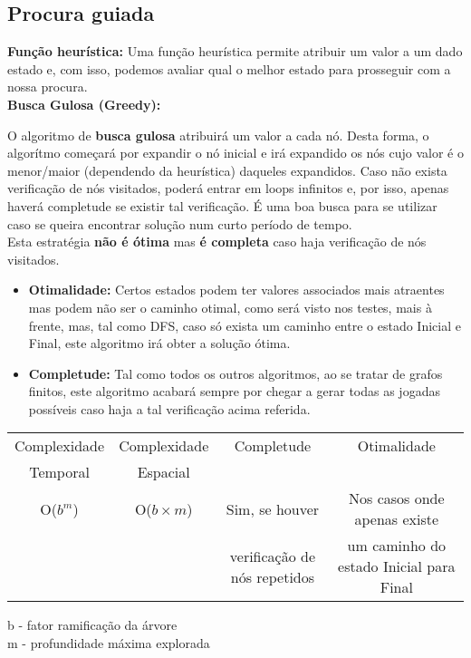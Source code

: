 \documentclass{article}
\begin{document}
\subsection{Procura guiada}
\textbf{Função heurística:} Uma função heurística permite atribuir um valor a um dado estado e, com isso, podemos avaliar qual o melhor estado para prosseguir com a nossa procura.\\[5mm]
\textbf{Busca Gulosa (Greedy):}\par
O algoritmo de \textbf{busca gulosa} atribuirá um valor a cada nó. Desta forma, o algorítmo começará por expandir o nó inicial e irá expandido os nós cujo valor é o menor/maior (dependendo da heurística) daqueles expandidos. Caso não exista verificação de nós visitados, poderá entrar em loops infinitos e, por isso, apenas haverá completude se existir tal verificação. É uma boa busca para se utilizar caso se queira encontrar solução num curto período de tempo.\\
Esta estratégia \textbf{não é ótima} mas \textbf{é completa} caso haja verificação de nós visitados.
\begin{itemize}
  \item{\textbf{Otimalidade:} Certos estados podem ter valores associados mais atraentes mas podem não ser o caminho otimal, como será visto nos testes, mais à frente, mas, tal como DFS, caso só exista um caminho entre o estado Inicial e Final, este algoritmo irá obter a solução ótima.}
  \item{\textbf{Completude:} Tal como todos os outros algoritmos, ao se tratar de grafos finitos, este algoritmo acabará sempre por chegar a gerar todas as jogadas possíveis caso haja a tal verificação acima referida.}
\end{itemize}
\begin{center}
\begin{tabular}{|c|c|c|c|}
  \hline
  Complexidade & Complexidade & Completude & Otimalidade\\
  Temporal & Espacial & & \\
  \hline
  O($b^m$) & O($b\times m$) & Sim, se houver & Nos casos onde apenas existe  \\
           &                & verificação de nós repetidos & um caminho do estado Inicial para Final \\
  \hline
\end{tabular}
\end{center}
b - fator ramificação da árvore\\
m - profundidade máxima explorada\\[5mm]
\end{document}
